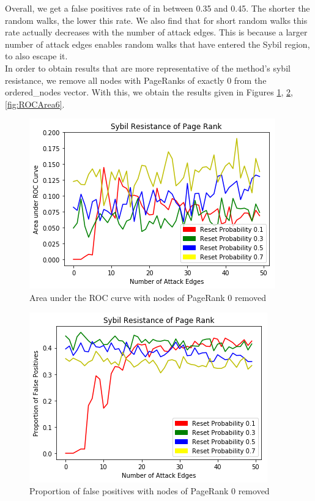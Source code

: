 \documentclass[twocolumn]{article}
\theoremstyle{definition}
\theoremstyle{theorem}
\begin{document}
\noindent Overall, we get a false positives rate of in between 0.35 and 0.45. The shorter the random walks, the lower this rate. We also find that for short random walks this rate actually decreases with the number of attack edges. This is because a larger number of attack edges enables random walks that have entered the Sybil region, to also escape it. \vspace{1em}\\

\noindent In order to obtain results that are more representative of the method's sybil resistance, we remove all nodes with PageRanks of exactly 0 from the ordered\_{}nodes vector. With this, we obtain the results given in Figures \ref{fig:ROCArea4}, \ref{fig:ROCArea5}, \ref{fig:ROCArea6}. \vspace{1em}\\

\begin{figure}
\includegraphics[scale=0.6]{ROCArea4}
\caption{Area under the ROC curve with nodes of PageRank 0 removed}
\label{fig:ROCArea4}
\end{figure}

\begin{figure}
\includegraphics[scale=0.6]{ROCArea5}
\caption{Proportion of false positives with nodes of PageRank 0 removed}
\label{fig:ROCArea5}
\end{figure}
\end{document}
